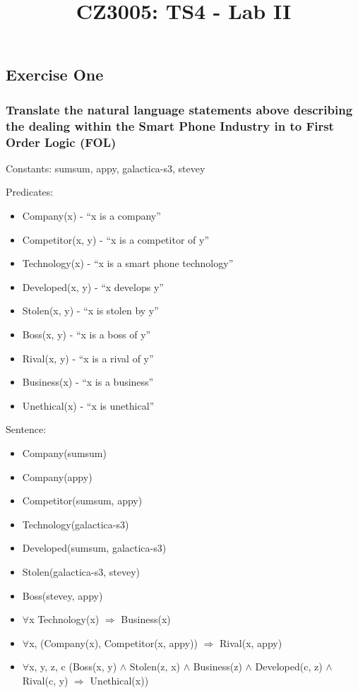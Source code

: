 \documentclass{article}
\date{} %
\title{CZ3005: TS4 - Lab II}
\begin{document}
\maketitle

\subsection*{Exercise One}
\subsubsection*{Translate the natural language statements above describing the dealing within the Smart Phone Industry in to First Order Logic (FOL)}

Constants: sumsum, appy, galactica-s3, stevey

Predicates: 
\begin{itemize}
\item Company(x) - ``x is a company''
\item Competitor(x, y) - ``x is a competitor of y''
\item Technology(x) - ``x is a smart phone technology''
\item Developed(x, y) - ``x develops y''
\item Stolen(x, y) - ``x is stolen by y''
\item Boss(x, y) - ``x is a boss of y''
\item Rival(x, y) - ``x is a rival of y''
\item Business(x) - ``x is a business''
\item Unethical(x) - ``x is unethical''
\end{itemize}

Sentence:
\begin{itemize}
\item Company(sumsum)
\item Company(appy)
\item Competitor(sumsum, appy)
\item Technology(galactica-s3)
\item Developed(sumsum, galactica-s3)
\item Stolen(galactica-s3, stevey)
\item Boss(stevey, appy)
\item $\forall$x Technology(x) $\Rightarrow$ Business(x)
\item $\forall$x, (Company(x), Competitor(x, appy)) $\Rightarrow$ Rival(x, appy)
\item $\forall$x, y, z, c (Boss(x, y) $\land$ Stolen(z, x) $\land$ Business(z) $\land$ Developed(c, z)  $\land$ Rival(c, y) $\Rightarrow$ Unethical(x))
\end{itemize}
\end{document}
